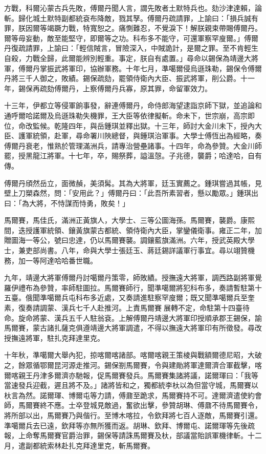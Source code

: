 \begin{pinyinscope}
方戰，科爾沁蒙古兵先敗，傅爾丹聞人言，謂先敗者土默特兵也。劾沙津達賴，論斬。歸化城土默特副都統袞布降敵，戮其孥。傅爾丹疏請罪，上諭曰：「損兵誠有罪，朕因爾等竭蹶力戰，特寬恕之。痛惻難忍，不覺淚下！解朕親束帶賜傅爾丹。爾等毋妄動，敵至能堅守，即爾等之功。科布多不能守，可還軍察罕廋爾。」傅爾丹復疏請罪，上諭曰：「輕信賊言，冒險深入，中賊詭計，是爾之罪。至不肯輕生自殺，力戰全歸，此爾能辨別輕重。事定，朕自有處置。」尋命以錫保為靖邊大將軍，傅爾丹掌振武將軍印，協辦軍務。十年七月，準噶爾侵烏遜珠勒，錫保令傅爾丹將三千人御之，敗績。錫保疏劾，罷領侍衛內大臣、振武將軍，削公爵。十一年，錫保再疏劾傅爾丹，上察傅爾丹兵寡，原其罪，命留軍效力。

十三年，伊都立等侵軍餉事發，辭連傅爾丹，命侍郎海望逮詣京師下獄，並追論和通呼爾哈諾爾及烏遜珠勒失機罪，王大臣等依律擬斬。命未下，世宗崩，高宗即位，命改監候。乾隆四年，與岳鍾琪並釋出獄。十三年，師討大金川未下，授內大臣、護軍統領，赴軍，尋命署川陜總督，與鍾琪治軍事。大學士傅恆出為經略，奏傅爾丹衰老，惟熟於管理滿洲兵，請專治營壘諸事。十四年，命為參贊。大金川師罷，授黑龍江將軍。十七年，卒，賜祭葬，謚溫愨。子兆德，襲爵；哈達哈，自有傳。

傅爾丹頎然岳立，面微赬，美須髯。其為大將軍，廷玉實薦之。鍾琪嘗過其帳，見壁上刀槊森然，問：「安用此？」傅爾丹曰：「此吾所素習者，懸以勵眾。」鍾琪出曰：「為大將，不恃謀而恃勇，敗矣！」

馬爾賽，馬佳氏，滿洲正黃旗人，大學士、三等公圖海孫。馬爾賽，襲爵。康熙間，迭授護軍統領、鑲黃旗蒙古都統、領侍衛內大臣，掌鑾儀衛事。雍正二年，加贈圖海一等公，號曰忠達，仍以馬爾賽襲。調鑲藍旗滿洲。六年，授武英殿大學士，兼吏部尚書。八年，命與大學士張廷玉、蔣廷錫詳議軍行事宜。尋以翊贊機務，加一等阿達哈哈番世職。

九年，靖邊大將軍傅爾丹討噶爾丹策零，師敗績。授撫遠大將軍，調西路副將軍覺羅伊禮布為參贊，率師駐圖拉。馬爾賽師行，聞準噶爾將犯科布多，奏請暫駐第十五臺。俄聞準噶爾兵屯科布多近處，又奏請進駐察罕廋爾；既又聞準噶爾兵至奎素，復奏請調蒙、漢兵七千人赴推河。上責馬爾賽展轉不定，命駐第十四臺待命。旋命將蒙、漢兵五千人駐翁袞。上解傅爾丹靖邊大將軍印授順承郡王錫保，諭馬爾賽，蒙古諸扎薩克俱遵靖邊大將軍調遣，不得以撫遠大將軍印有所徵發。尋改授撫遠將軍，駐扎克拜達里克。

十年秋，準噶爾大舉內犯，掠喀爾喀諸部。喀爾喀親王策棱與戰額爾德尼昭，大破之，餘眾循鄂爾昆河源走推河。錫保劄馬爾賽，令與建勛將軍達爾濟合軍截擊，喀爾喀親王丹津多爾濟亦馳報，促馬爾賽發兵。馬爾賽集諸將議，諾爾琿曰：「我等當速發兵迎截，遲且將不及。」諸將皆和之，獨都統李杕以為但當守城，馬爾賽以杕言為然。諾爾琿、博爾屯等力請，傅鼐至跪求，馬爾賽持不可。達爾濟遣使約會師，馬爾賽終不應。士卒登城見敵過，奮欲出擊，參贊胡琳、傅鼐不待馬爾賽令，將所部以出，馬爾賽乃與偕行。至博木喀拉，令欽拜將七百人逐敵，馬爾賽引還。準噶爾兵去已遠，欽拜等亦無所獲而返。胡琳、欽拜、博爾屯、諾爾琿等先後疏報，上命奪馬爾賽官爵治罪，錫保等請誅馬爾賽及杕，部議當貽誤軍機律斬。十二月，遣副都統索林赴扎克拜達里克，斬馬爾賽。


\end{pinyinscope}
